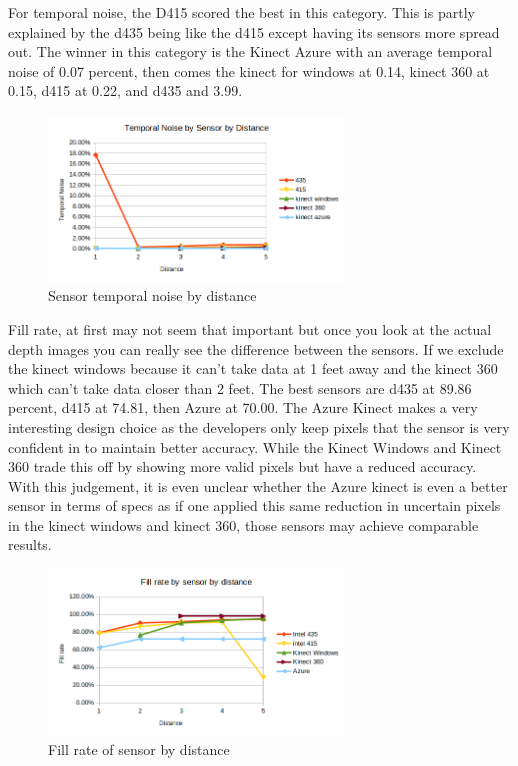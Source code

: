 For temporal noise, the D415 scored the best in this category. This is partly explained by the d435 being like the d415 except having its sensors more spread out. The winner in this category is the Kinect Azure with an average temporal noise of 0.07 percent, then comes the kinect for windows at 0.14, kinect 360 at 0.15, d415 at 0.22, and d435 and 3.99.
\begin{figure}[!htb]
	\caption{Sensor temporal noise by distance}
	\centering
	\includegraphics[width=0.7\textwidth]{images/temporal_noise.png}
\end{figure}

Fill rate, at first may not seem that important but once you look at the actual depth images you can really see the difference between the sensors. If we exclude the kinect windows because it can't take data at 1 feet away and the kinect 360 which can't take data closer than 2 feet. The best sensors are d435 at 89.86 percent, d415 at 74.81, then Azure at 70.00. The Azure Kinect makes a very interesting design choice as the developers only keep pixels that the sensor is very confident in to maintain better accuracy. While the Kinect Windows and Kinect 360 trade this off by showing more valid pixels but have a reduced accuracy. With this judgement, it is even unclear whether the Azure kinect is even a better sensor in terms of specs as if one applied this same reduction in uncertain pixels in the kinect windows and kinect 360, those sensors may achieve comparable results.

\begin{figure}[!htb]
	\caption{Fill rate of sensor by distance}
	\centering
	\includegraphics[width=0.7\textwidth]{images/fill_rate.png}
\end{figure}

